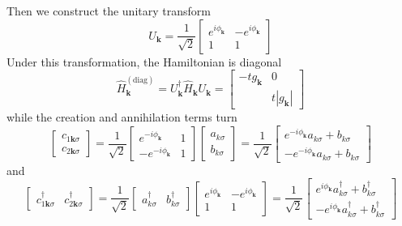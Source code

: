 \documentclass[../../../main.tex]{subfiles}
\begin{document}
Then we construct the unitary transform
\begin{equation*}
  U_\mathbf{k} = \frac{1}{\sqrt{2}}\begin{bmatrix} e^{i\phi_\mathbf{k}} & -e^{i\phi_\mathbf{k}} \\ 1 & 1 \end{bmatrix}
\end{equation*}
Under this transformation, the Hamiltonian is diagonal 
\begin{equation*}
\hat{H}_\mathbf{k}^{(\mathrm{diag})} = U_\mathbf{k}^\dagger \hat{H}_\mathbf{k} U_\mathbf{k}  
  = \begin{bmatrix} -t g_\mathbf{k} & 0 \\  &t |g_\mathbf{k}| \end{bmatrix}
\end{equation*}
while the creation and annihilation terms turn
\begin{equation*}
  \begin{bmatrix} c_{1\mathbf{k}\sigma} \\ c_{2\mathbf{k}\sigma} \end{bmatrix}
  = \frac{1}{\sqrt{2}}
  \begin{bmatrix} e^{-i\phi_\mathbf{k}} & 1 \\ -e^{-i\phi_\mathbf{k}} & 1 \end{bmatrix}
\begin{bmatrix} a_{k\sigma} \\ b_{k\sigma} \end{bmatrix}
  = \frac{1}{\sqrt{2}}
  \begin{bmatrix}
  e^{-i\phi_\mathbf{k}}a_{k\sigma}+b_{k\sigma}\\
-e^{-i\phi_\mathbf{k}}a_{k\sigma}+b_{k\sigma}
\end{bmatrix}
\end{equation*}
and 
\begin{equation*}
  \begin{bmatrix}
    c^\dagger_{1\mathbf{k}\sigma}&c^\dagger_{2\mathbf{k}\sigma}
  \end{bmatrix}
=\frac{1}{\sqrt{2}}
\begin{bmatrix}
  a^\dagger_{k\sigma} & b^\dagger_{k\sigma}
\end{bmatrix}
\begin{bmatrix}
e^{i\phi_\mathbf{k}} & -e^{i\phi_\mathbf{k}}\\
1 & 1
\end{bmatrix}
=\frac{1}{\sqrt{2}}
\begin{bmatrix}
  e^{i\phi_\mathbf{k}}a^\dagger_{k\sigma}+b^\dagger_{k\sigma}\\
-e^{i\phi_\mathbf{k}}a^\dagger_{k\sigma}+b^\dagger_{k\sigma}
\end{bmatrix}
\end{equation*}
\end{document}
